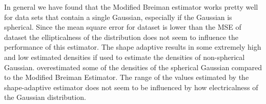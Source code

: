 
	In general we have found that the Modified Breiman estimator works pretty well for data sets that contain a single Gaussian, especially if the Gaussian is spherical. Since the mean square error for dataset \baakmanFive is lower than the MSE of dataset \baakmanFour the ellipticalness of the distribution does not seem to influence the performance of this estimator. 
	The shape adaptive \mbe results in some extremely high and low estimated densities if used to estimate the densities of non-spherical Gaussian. \sambe overestimated some of the densities of the spherical Gaussian compared to the Modified Breiman Estimator. The range of the values estimated by the shape-adaptive estimator does not seem to be influenced by how electricalness of the Gaussian distribution. 
